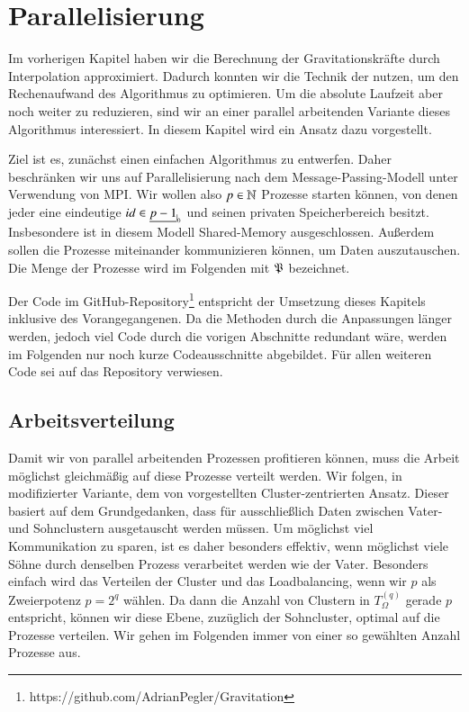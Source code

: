 \section{Parallelisierung}
\label{sec:parallelpart}
  Im vorherigen Kapitel haben wir die Berechnung der Gravitationskräfte durch Interpolation approximiert. Dadurch konnten wir die Technik der \hquad nutzen, um den Rechenaufwand des Algorithmus zu 
  optimieren.
  Um die absolute Laufzeit aber noch weiter zu reduzieren, sind wir an einer parallel arbeitenden Variante dieses Algorithmus interessiert. In diesem Kapitel wird ein Ansatz dazu vorgestellt.
  
  Ziel ist es, zunächst einen einfachen Algorithmus zu entwerfen. Daher beschränken wir uns auf Parallelisierung nach dem Message-Passing-Modell unter Verwendung von MPI. Wir wollen also 
  $p \in \mathbb{N}$ Prozesse starten können, von denen jeder eine eindeutige $id \in \nullhaken{p-1}$ und seinen privaten Speicherbereich besitzt. Insbesondere ist in diesem Modell Shared-Memory ausgeschlossen. 
  Außerdem sollen die Prozesse miteinander kommunizieren können, um Daten auszutauschen. Die Menge der Prozesse wird im Folgenden mit $\mathfrak{P}$ bezeichnet.

  Der Code im GitHub-Repository\footnote{https://github.com/AdrianPegler/Gravitation} entspricht der Umsetzung dieses Kapitels inklusive des Vorangegangenen. Da die Methoden durch die Anpassungen
  länger werden, jedoch viel Code durch die vorigen Abschnitte redundant wäre, werden im Folgenden nur noch kurze Codeausschnitte abgebildet. Für allen weiteren Code sei auf das Repository verwiesen.
  
  \subsection{Arbeitsverteilung}
  \label{sec:work}
    Damit wir von parallel arbeitenden Prozessen profitieren können, muss die Arbeit möglichst gleichmäßig auf diese Prozesse verteilt werden. Wir folgen, in modifizierter Variante, dem von 
    \citet{distrh2} vorgestellten Cluster-zentrierten Ansatz. 
    Dieser basiert auf dem Grundgedanken, dass für \vorruck ausschließlich Daten zwischen Vater- und Sohnclustern ausgetauscht werden müssen. Um möglichst viel Kommunikation zu sparen, ist es daher
    besonders effektiv, wenn möglichst viele Söhne durch denselben Prozess verarbeitet werden wie der Vater. Besonders einfach wird das Verteilen der Cluster und das Loadbalancing, wenn wir $p$ als 
    Zweierpotenz $p = 2^q$ wählen. Da dann die Anzahl von Clustern in $T_\Omega^{(q)}$ gerade $p$ entspricht, können wir diese Ebene, zuzüglich der Sohncluster, optimal auf die Prozesse verteilen.
    Wir gehen im Folgenden immer von einer so gewählten Anzahl Prozesse aus.
    
